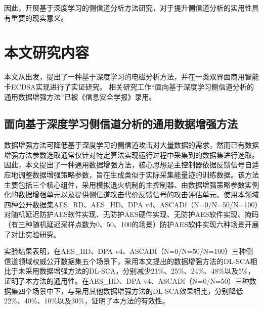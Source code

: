 {	因此，开展基于深度学习的侧信道分析方法研究，对于提升侧信道分析的实用性具有重要的现实意义。
	\section{本文研究内容}
	本文从\jiaodu 出发，提出了一种基于深度学习的电磁分析方法，并在一类双界面商用智能卡ECDSA实现进行了实证研究。%
	\ifshowcontent 相关研究工作“面向基于深度学习侧信道分析的通用数据增强方法”已被《信息安全学报》录用。\fi
	\subsection{面向基于深度学习侧信道分析的通用数据增强方法}
	数据增强方法可降低基于深度学习的侧信道攻击对大量数据的需求，然而已有数据增强方法参数选取通常仅针对特定算法实现运行过程中采集到的数据集进行选取。
	因此，本文提出了一种通用数据增强方法，核心思想是主控制器依据反馈信号自适应地调整数据增强策略参数，旨在生成类似于实际采集能量迹的训练数据。该方法主要包括三个核心组件，采用模拟退火机制的主控制器、由数据增强策略参数实例化的数据增强单元以及提供侧信道攻击代价反馈信号的攻击评估单元。使用本领域四种公开数据集AES\_RD、AES\_HD、DPA v4、ASCADf（N=0/N=50/N=100）对随机延迟防护AES软件实现、无防护AES硬件实现、无防护AES软件实现、掩码（有三种随机延迟采样点数为0、50、100的场景）防护AES软件实现六种场景开展了对比实验研究。
	
	实验结果表明，在AES\_HD、DPA v4、ASCADf（N=0/N=50/N=100）三种侧信道领域权威公开数据集五个场景下，采用本文提出的数据增强方法的DL-SCA相比于未采用数据增强方法的DL-SCA，\chenggongtiaoshu 分别减少21\%、25\%、24\%、48\%以及5\%，证明了本方法的通用性。在AES\_HD、DPA v4、ASCADf（N=0/N=50）三种数据集四个场景中下，与采用其他数据增强方法的DL-SCA效果相比，\chenggongtiaoshu 分别降低22\%、40\%、10\%以及30\%，证明了本方法的有效性。
}
